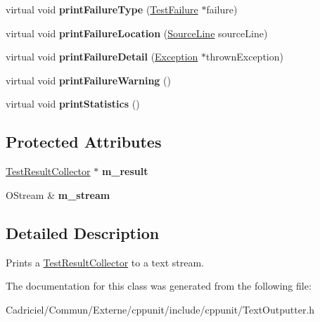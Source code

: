 \begin{DoxyCompactItemize}
\item 
\hypertarget{class_text_outputter_a95c601c6a903700450d95e13db502247}{virtual void {\bfseries print\-Failure\-Type} (\hyperlink{class_test_failure}{Test\-Failure} $\ast$failure)}\label{class_text_outputter_a95c601c6a903700450d95e13db502247}

\item 
\hypertarget{class_text_outputter_a5ba7ad1968b180ce9593373718632af9}{virtual void {\bfseries print\-Failure\-Location} (\hyperlink{class_source_line}{Source\-Line} source\-Line)}\label{class_text_outputter_a5ba7ad1968b180ce9593373718632af9}

\item 
\hypertarget{class_text_outputter_ae1a2ad2deebf4b12f803c59d867980f7}{virtual void {\bfseries print\-Failure\-Detail} (\hyperlink{class_exception}{Exception} $\ast$thrown\-Exception)}\label{class_text_outputter_ae1a2ad2deebf4b12f803c59d867980f7}

\item 
\hypertarget{class_text_outputter_a254f58361b8f5c59b60df1c007d9a438}{virtual void {\bfseries print\-Failure\-Warning} ()}\label{class_text_outputter_a254f58361b8f5c59b60df1c007d9a438}

\item 
\hypertarget{class_text_outputter_aeabfe5420c137b0a935c5b0acb45a6d8}{virtual void {\bfseries print\-Statistics} ()}\label{class_text_outputter_aeabfe5420c137b0a935c5b0acb45a6d8}

\end{DoxyCompactItemize}
\subsection*{Protected Attributes}
\begin{DoxyCompactItemize}
\item 
\hypertarget{class_text_outputter_a465e8c580e6f2db9ed021e1c44b95eb2}{\hyperlink{class_test_result_collector}{Test\-Result\-Collector} $\ast$ {\bfseries m\-\_\-result}}\label{class_text_outputter_a465e8c580e6f2db9ed021e1c44b95eb2}

\item 
\hypertarget{class_text_outputter_a947e16694e57297974e0f651d6298b80}{O\-Stream \& {\bfseries m\-\_\-stream}}\label{class_text_outputter_a947e16694e57297974e0f651d6298b80}

\end{DoxyCompactItemize}


\subsection{Detailed Description}
Prints a \hyperlink{class_test_result_collector}{Test\-Result\-Collector} to a text stream. 

The documentation for this class was generated from the following file\-:\begin{DoxyCompactItemize}
\item 
Cadriciel/\-Commun/\-Externe/cppunit/include/cppunit/Text\-Outputter.\-h\end{DoxyCompactItemize}
